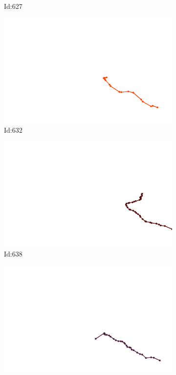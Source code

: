 \documentclass[12pt,twoside]{report}
\begin{document}
\begin{figure}
\begin{subfigure}[b]{0.20\textwidth}
\caption{Id:627}
\end{subfigure}
\begin{subfigure}[b]{0.20\textwidth}
\centering
\includegraphics[width=\textwidth]{../trajectories/632.png}
\caption{Id:632}
\end{subfigure}
\begin{subfigure}[b]{0.20\textwidth}
\centering
\includegraphics[width=\textwidth]{../trajectories/638.png}
\caption{Id:638}
\end{subfigure}
\begin{subfigure}[b]{0.20\textwidth}
\centering
\includegraphics[width=\textwidth]{../trajectories/648.png}

\end{subfigure}
\end{figure}
\end{document}
